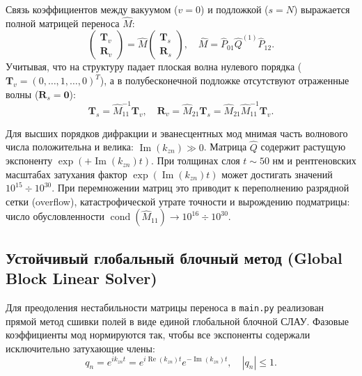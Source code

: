 \documentclass[a4paper,11pt]{article}
\begin{document}
Связь коэффициентов между вакуумом ($v=0$) и подложкой ($s=N$) выражается полной матрицей переноса $\hat{M}$:
\begin{equation}
\begin{pmatrix} \mathbf{T}_v \\ \mathbf{R}_v \end{pmatrix} = \hat{M} \begin{pmatrix} \mathbf{T}_s \\ \mathbf{R}_s \end{pmatrix}, \quad \hat{M} = \hat{P}_{01} \hat{Q}^{(1)} \hat{P}_{12}.
\label{eq:transfer_matrix_def}
\end{equation}
Учитывая, что на структуру падает плоская волна нулевого порядка ($\mathbf{T}_v = (0,\dots,1,\dots,0)^T$), а в полубесконечной подложке отсутствуют отраженные волны ($\mathbf{R}_s = \mathbf{0}$):
\begin{equation}
\mathbf{T}_s = \hat{M}_{11}^{-1} \mathbf{T}_v, \quad \mathbf{R}_v = \hat{M}_{21} \mathbf{T}_s = \hat{M}_{21} \hat{M}_{11}^{-1} \mathbf{T}_v.
\end{equation}

\begin{notebox}
Для высших порядков дифракции и эванесцентных мод мнимая часть волнового числа положительна и велика: $\operatorname{Im}(k_{zn}) \gg 0$. Матрица $\hat{Q}$ содержит растущую экспоненту $\exp(+ \operatorname{Im}(k_{zn}) t)$. При толщинах слоя $t \sim 50\text{ нм}$ и рентгеновских масштабах затухания фактор $\exp(\operatorname{Im}(k_{zn}) t)$ может достигать значений $10^{15} \div 10^{30}$. При перемножении матриц это приводит к переполнению разрядной сетки (overflow), катастрофической утрате точности и вырождению подматрицы: число обусловленности $\operatorname{cond}(\hat{M}_{11}) \to 10^{16} \div 10^{30}$.
\end{notebox}

\subsection{Устойчивый глобальный блочный метод (Global Block Linear Solver)}
Для преодоления нестабильности матрицы переноса в \texttt{main.py} реализован прямой метод сшивки полей в виде единой глобальной блочной СЛАУ. Фазовые коэффициенты мод нормируются так, чтобы все экспоненты содержали исключительно затухающие члены:
\begin{equation}
q_n = e^{i k_{zn} t} = e^{i \operatorname{Re}(k_{zn}) t} e^{-\operatorname{Im}(k_{zn}) t}, \quad |q_n| \le 1.
\end{equation}
\end{document}
